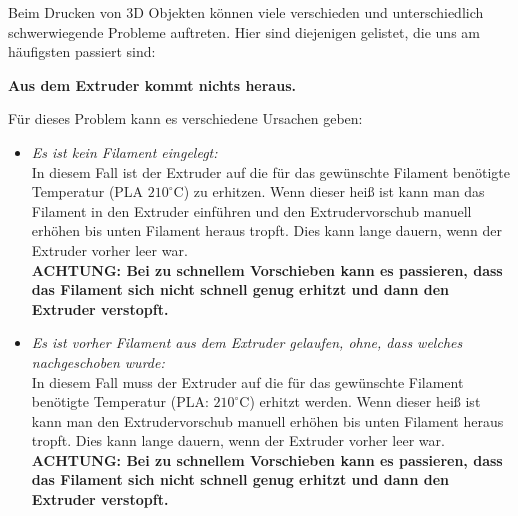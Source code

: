 \documentclass[11pt,a4paper]{scrartcl}
\begin{document}
Beim Drucken von 3D Objekten können viele verschieden und unterschiedlich schwerwiegende Probleme auftreten. Hier sind diejenigen gelistet, die uns am häufigsten passiert sind:\\
\begin{description}

\item \textbf{Aus dem Extruder kommt nichts heraus.}\\
Für dieses Problem kann es verschiedene Ursachen geben:
\begin{itemize}
\item \textit{Es ist kein Filament eingelegt:}\\
In diesem Fall ist der Extruder auf die für das gewünschte Filament benötigte Temperatur (PLA $210^\circ$C) zu erhitzen. Wenn dieser heiß ist kann man das Filament in den Extruder einführen und den Extrudervorschub manuell erhöhen bis unten Filament heraus tropft. Dies kann lange dauern, wenn der Extruder vorher leer war.\\
\textbf{ACHTUNG: Bei zu schnellem Vorschieben kann es passieren, dass das Filament sich nicht schnell genug erhitzt und dann den Extruder verstopft.}

\item \textit{Es ist vorher Filament aus dem Extruder gelaufen, ohne, dass welches nachgeschoben wurde:}\\
In diesem Fall muss der Extruder auf die für das gewünschte Filament benötigte Temperatur (PLA: $210^\circ$C) erhitzt werden. Wenn dieser heiß ist kann man den Extrudervorschub manuell erhöhen bis unten Filament heraus tropft. Dies kann lange dauern, wenn der Extruder vorher leer war.\\
\textbf{ACHTUNG: Bei zu schnellem Vorschieben kann es passieren, dass das Filament sich nicht schnell genug erhitzt und dann den Extruder verstopft.}
\end{itemize}


\end{description}
\end{document}
